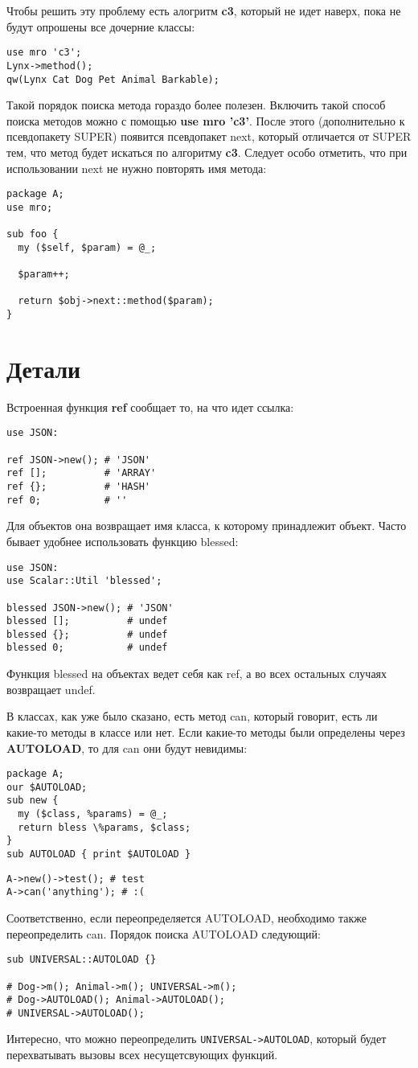 Чтобы решить эту проблему есть алогритм \textbf{c3}, который не идет наверх, пока не будут опрошены все дочерние классы:
\begin{verbatim}
use mro 'c3';
Lynx->method();
qw(Lynx Cat Dog Pet Animal Barkable);
\end{verbatim}
Такой порядок поиска метода гораздо более полезен. Включить такой способ поиска методов можно с помощью  \textbf{use mro 'c3'}. После этого (дополнительно к псевдопакету SUPER) появится псевдопакет next, который отличается от SUPER тем, что метод будет искаться по алгоритму \textbf{c3}. Следует особо отметить, что при использовании next не нужно повторять имя метода:
\begin{verbatim}
package A;
use mro;

sub foo {
  my ($self, $param) = @_;

  $param++;

  return $obj->next::method($param);
}
\end{verbatim}

\section{Детали} %
Встроенная функция \textbf{ref} сообщает то, на что идет ссылка:
\begin{verbatim}
use JSON:

ref JSON->new(); # 'JSON'
ref [];          # 'ARRAY'
ref {};          # 'HASH'
ref 0;           # ''
\end{verbatim}
Для объектов она возвращает имя класса, к которому принадлежит объект. Часто бывает удобнее использовать функцию blessed:
\begin{verbatim}
use JSON:
use Scalar::Util 'blessed';

blessed JSON->new(); # 'JSON'
blessed [];          # undef
blessed {};          # undef
blessed 0;           # undef
\end{verbatim}
Функция blessed на объектах ведет себя как ref, а во всех остальных случаях возвращает undef.

В классах, как уже было сказано, есть метод can, который говорит, есть ли какие-то методы в классе или нет. Если какие-то методы были определены через \textbf{AUTOLOAD}, то для can они будут невидимы:
\begin{verbatim}
package A;
our $AUTOLOAD;
sub new {
  my ($class, %params) = @_;
  return bless \%params, $class;
}
sub AUTOLOAD { print $AUTOLOAD }
\end{verbatim}
\begin{verbatim}
A->new()->test(); # test
A->can('anything'); # :(
\end{verbatim}
Соответственно, если переопределяется AUTOLOAD, необходимо также переопределить can. Порядок поиска AUTOLOAD следующий:
\begin{verbatim}
sub UNIVERSAL::AUTOLOAD {}

# Dog->m(); Animal->m(); UNIVERSAL->m();
# Dog->AUTOLOAD(); Animal->AUTOLOAD();
# UNIVERSAL->AUTOLOAD();
\end{verbatim}
Интересно, что можно переопределить \verb|UNIVERSAL->AUTOLOAD|, который будет перехватывать вызовы всех несущетсвующих функций.

